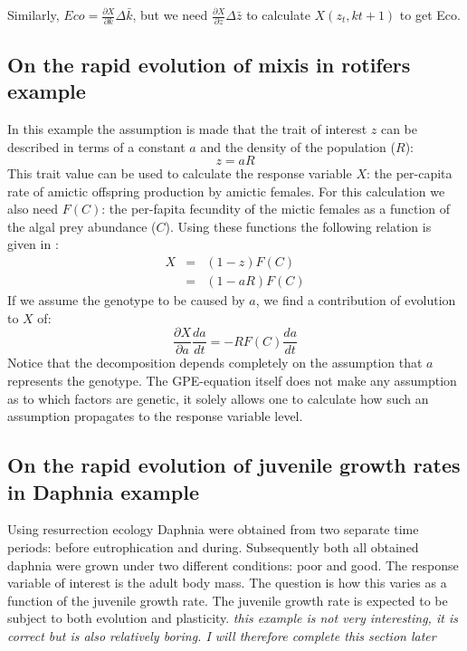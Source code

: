 Similarly, $Eco=\frac{\partial X}{\partial k} \Delta \bar{k}$, but we need $\frac{\partial X}{\partial z} \Delta \bar{z}$ to calculate $X(z_{t},k{t+1})$ to get Eco.

\subsection{On the rapid evolution of mixis in rotifers example}
In this example the assumption is made that the trait of interest $z$ can be described in terms of a constant $a$ and the density of the population ($R$):
\begin{equation}
z=aR
\end{equation}
This trait value can be used to calculate the response variable $X$: the per-capita rate of amictic offspring production by amictic females. For this calculation we also need $F(C)$: the per-fapita fecundity of the mictic females as a function of the algal prey abundance ($C$). Using these functions the following relation is given in \citet{Ellner2011}:
\begin{eqnarray}
X &=& (1-z) F(C) \\
  &=& (1-aR) F(C)
\end{eqnarray}
If we assume the genotype to be caused by $a$, we find a contribution of evolution to $X$ of:
\begin{equation}
\frac{\partial X}{\partial a}\frac{da}{dt} = - R F(C) \frac{da}{dt}
\end{equation}
Notice that the decomposition depends completely on the assumption that $a$ represents the genotype. The GPE-equation itself does not make any assumption as to which factors are genetic, it solely allows one to calculate how such an assumption propagates to the response variable level.
\subsection{On the rapid evolution of juvenile growth rates in Daphnia example}
Using resurrection ecology Daphnia were obtained from two separate time periods: before eutrophication and during. Subsequently both all obtained daphnia were grown under two different conditions: poor and good. The response variable of interest is the  adult body mass. The question is how this varies as a function of the juvenile growth rate. The juvenile growth rate is expected to be subject to both evolution and plasticity.
\textit{this example is not very interesting, it is correct but is also relatively boring. I will therefore complete this section later}


